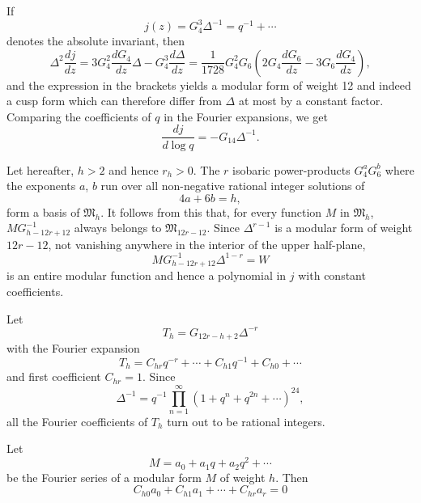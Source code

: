 If 
\begin{equation*}
j(z)=G^{3}_{4}\Delta^{-1}=q^{-1}+\cdots\tag{7}\label{app-eq7}
\end{equation*}
denotes the absolute invariant, then
$$
\Delta^{2}\frac{dj}{dz}=3G^{2}_{4}\frac{dG_{4}}{dz}\Delta-G^{3}_{4}\frac{d\Delta}{dz}=\frac{1}{1728}G^{2}_{4}G_{6}\left(2G_{4}\frac{dG_{6}}{dz}-3G_{6}\frac{dG_{4}}{dz}\right), 
$$
and the expression in the brackets yields a modular form of weight 12
and indeed a cusp form which can therefore differ from $\Delta$ at
most by a constant factor. Comparing the coefficients of $q$ in the
Fourier expansions, we get
\begin{equation*}
\frac{dj}{d\log q}=-G_{14}\Delta^{-1}.\tag{8}\label{app-eq8}
\end{equation*}

Let hereafter, $h>2$ and hence $r_{h}>0$. The $r$ isobaric
power-products $G^{a}_{4}G^{b}_{6}$ where the exponents $a$, $b$ run
over all non-negative rational integer solutions of 
$$
4a+6b=h,
$$\pageoriginale
form a basis of $\mathfrak{M}_{h}$. It follows from this that, for
every function $M$ in $\mathfrak{M}_{h}$, $MG^{-1}_{h-12r+12}$ always
belongs to $\mathfrak{M}_{12r-12}$. Since $\Delta^{r-1}$ is a modular
form of weight $12r-12$, not vanishing anywhere in the interior of the
upper half-plane,
\begin{equation*}
MG^{-1}_{h-12r+12}\Delta^{1-r}=W\tag{9}\label{app-eq9}
\end{equation*}
is an entire modular function and hence a polynomial in $j$ with
constant coefficients.

Let
\begin{equation*}
T_{h}=G_{12r-h+2}\Delta^{-r}\tag{10}\label{app-eq10}
\end{equation*}
with the Fourier expansion
\begin{equation*}
T_{h}=C_{hr}q^{-r}+\cdots+C_{h1}q^{-1}+C_{h0}+\cdots\tag{11}\label{app-eq11}
\end{equation*}
and first coefficient $C_{hr}=1$. Since
\begin{equation*}
\Delta^{-1}=q^{-1}\prod^{\infty}_{n=1}(1+q^{n}+q^{2n}+\cdots)^{24},\tag{12}\label{app-eq12} 
\end{equation*}
all the Fourier coefficients of $T_{h}$ turn out to be rational
integers.

\setcounter{thm}{0}
\begin{thm}\label{app-thm1}
Let
\begin{equation*}
M=a_{0}+a_{1}q+a_{2}q^{2}+\cdots \tag{13}\label{app-eq13}
\end{equation*}
be the Fourier series of a modular form $M$ of weight $h$. Then
$$
C_{h0}a_{0}+C_{h1}a_{1}+\cdots+C_{hr}a_{r}=0
$$
\end{thm}

